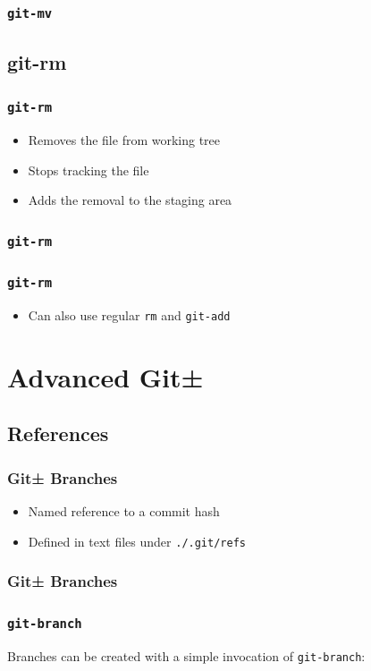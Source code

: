 \documentclass{beamer}
\begin{document}
\begin{frame}
\frametitle{\texttt{git-mv}}

\end{frame}

\subsection{git-rm}
\begin{frame}
\frametitle{\texttt{git-rm}}
\begin{itemize}
\item{Removes the file from working tree}
\item{Stops tracking the file}
\item{Adds the removal to the staging area}
\end{itemize}
\end{frame}

\begin{frame}[fragile]
\frametitle{\texttt{git-rm}}

\end{frame}

\begin{frame}
\frametitle{\texttt{git-rm}}
\begin{itemize}
\item{Can also use regular \texttt{rm} and \texttt{git-add}}
\end{itemize}
\end{frame}

\section{Advanced Git±}
\subsection{References}
\begin{frame}
\frametitle{Git± Branches}
\begin{itemize}
\item<2->{Named reference to a commit hash}
\item<3->{Defined in text files under \texttt{./.git/refs}}
\end{itemize}
\end{frame}

\begin{frame}[fragile]
\frametitle{Git± Branches}

\end{frame}

\begin{frame}[fragile]
\frametitle{\texttt{git-branch}}
Branches can be created with a simple invocation of \texttt{git-branch}:

\end{frame}
\end{document}
